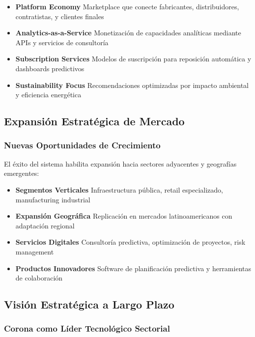 \documentclass[twocolumn]{article}
\begin{document}
\begin{itemize}
    \item \textbf{Platform Economy} Marketplace que conecte fabricantes, distribuidores, contratistas, y clientes finales
    \item \textbf{Analytics-as-a-Service} Monetización de capacidades analíticas mediante APIs y servicios de consultoría
    \item \textbf{Subscription Services} Modelos de suscripción para reposición automática y dashboards predictivos
    \item \textbf{Sustainability Focus} Recomendaciones optimizadas por impacto ambiental y eficiencia energética
\end{itemize}

\subsection{Expansión Estratégica de Mercado}

\subsubsection{Nuevas Oportunidades de Crecimiento}

El éxito del sistema habilita expansión hacia sectores adyacentes y geografías emergentes:

\begin{itemize}
    \item \textbf{Segmentos Verticales} Infraestructura pública, retail especializado, manufacturing industrial
    \item \textbf{Expansión Geográfica} Replicación en mercados latinoamericanos con adaptación regional
    \item \textbf{Servicios Digitales} Consultoría predictiva, optimización de proyectos, risk management
    \item \textbf{Productos Innovadores} Software de planificación predictiva y herramientas de colaboración
\end{itemize}

\subsection{Visión Estratégica a Largo Plazo}

\subsubsection{Corona como Líder Tecnológico Sectorial}
\end{document}
